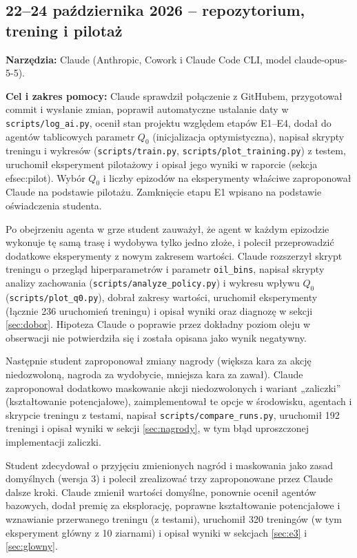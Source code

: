 \subsection*{22--24 października 2026 -- repozytorium, trening i pilotaż}
\textbf{Narzędzia:} Claude (Anthropic, Cowork i Claude Code CLI, model
claude-opus-5-5).

\textbf{Cel i zakres pomocy:} Claude sprawdził połączenie z GitHubem, przygotował
commit i wysłanie zmian, poprawił automatyczne ustalanie daty w
\texttt{scripts/log\_ai.py}, ocenił stan projektu względem etapów E1--E4, dodał
do agentów tablicowych parametr $Q_0$ (inicjalizacja optymistyczna), napisał
skrypty treningu i wykresów (\texttt{scripts/train.py},
\texttt{scripts/plot\_training.py}) z testem, uruchomił eksperyment pilotażowy
i opisał jego wyniki w raporcie (sekcja 
ef{sec:pilot}). Wybór $Q_0$ i liczby
epizodów na eksperymenty właściwe zaproponował Claude na podstawie pilotażu.
Zamknięcie etapu E1 wpisano na podstawie oświadczenia studenta.

Po obejrzeniu agenta w grze student zauważył, że agent w każdym epizodzie wykonuje tę
samą trasę i wydobywa tylko jedno złoże, i polecił przeprowadzić dodatkowe
eksperymenty z nowym zakresem wartości. Claude rozszerzył skrypt treningu o przegląd
hiperparametrów i parametr \texttt{oil\_bins}, napisał skrypty analizy zachowania
(\texttt{scripts/analyze\_policy.py}) i wykresu wpływu $Q_0$
(\texttt{scripts/plot\_q0.py}), dobrał zakresy wartości, uruchomił eksperymenty
(łącznie 236 uruchomień treningu) i opisał wyniki oraz diagnozę w sekcji
\ref{sec:dobor}. Hipoteza Claude o poprawie przez dokładny poziom oleju w obserwacji
nie potwierdziła się i została opisana jako wynik negatywny.

Następnie student zaproponował zmiany nagrody (większa kara za akcję niedozwoloną,
nagroda za wydobycie, mniejsza kara za zawał). Claude zaproponował dodatkowo
maskowanie akcji niedozwolonych i wariant „zaliczki” (kształtowanie potencjałowe),
zaimplementował te opcje w środowisku, agentach i skrypcie treningu z testami,
napisał \texttt{scripts/compare\_runs.py}, uruchomił 192 treningi i opisał wyniki
w sekcji \ref{sec:nagrody}, w tym błąd uproszczonej implementacji zaliczki.

Student zdecydował o przyjęciu zmienionych nagród i maskowania jako zasad domyślnych
(wersja 3) i polecił zrealizować trzy zaproponowane przez Claude dalsze kroki.
Claude zmienił wartości domyślne, ponownie ocenił agentów bazowych, dodał premię za
eksplorację, poprawne kształtowanie potencjałowe i wznawianie przerwanego treningu
(z testami), uruchomił 320 treningów (w tym eksperyment główny z 10 ziarnami)
i opisał wyniki w sekcjach \ref{sec:e3} i \ref{sec:glowny}.

